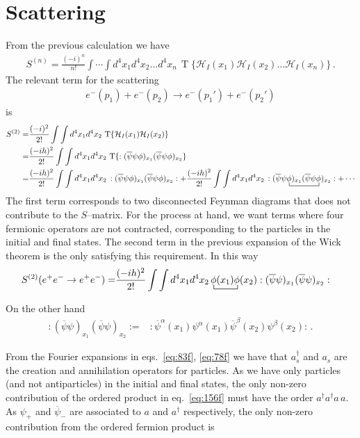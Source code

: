 \section{Scattering}
\label{sec:scattering}
From the previous calculation we have
\begin{align}
S^{(n)}=  \frac{(-i)^n}{n!}\int\cdots\int d^4x_1 d^4x_2\ldots d^4x_n\,\operatorname{T}\{\mathcal{H}_I(x_1)\mathcal{H}_I(x_2)\ldots\mathcal{H}_I(x_n)\}\,.
\end{align}
The relevant term for the scattering
\begin{align}
  e^{-}(p_1)+e^{-}(p_2)\to   e^{-}(p_1')+e^{-}(p_2')
\end{align}
is
\begin{align}
S^{(2)}=&  \frac{(-i)^2}{2!}\int\int d^4x_1 d^4x_2\,\operatorname{T}\{\mathcal{H}_I(x_1)\mathcal{H}_I(x_2)\}\nonumber\\
=&  \frac{(-ih)^2}{2!}\int\int d^4x_1 d^4x_2\,\operatorname{T}\{:(\overline{\psi}\psi\phi)_{x_1}(\overline{\psi}\psi\phi)_{x_2}\}\nonumber\\
=& 
 \frac{(-ih)^2}{2!}\int\int d^4x_1 d^4x_2\,:(\overline{\psi}\psi\phi)_{x_1}(\overline{\psi}\psi\phi
)_{x_2}:+
 \frac{(-ih)^2}{2!}\int\int d^4x_1 d^4x_2\,:(\overline{\psi}
\bcontraction{\psi}{\phi}{)_{x_1}(\overline{\psi}\psi}{\phi}
\psi\phi)_{x_1}(\overline{\psi}\psi\phi
)_{x_2}:+\cdots
\end{align}
The first term corresponds to two  disconnected Feynman diagrams that does not contribute to the $S$--matrix. For the process at hand, we want terms where four fermionic operators are not contracted, corresponding to the particles in the initial and final states. The second term in the previous expansion of the Wick theorem is the only satisfying this requirement. In this way
\begin{align}
  S^{(2)}(e^+ e^-\to e^+e^-)=&\frac{(-ih)^2}{2!}\int\int d^4x_1 d^4x_2
\bcontraction{\,}{\phi}{(x_1)}{\phi}
\,\phi(x_1)\phi(x_2):(\overline{\psi}\psi)_{x_1}(\overline{\psi}\psi)_{x_2}:
\end{align}

On the other hand 
\begin{align}
\label{eq:156f}
  :(\overline{\psi}\psi)_{x_1}(\overline{\psi}\psi)_{x_2}:=&
:\overline{\psi}^\alpha(x_1)\psi^\alpha(x_1)\overline{\psi}^\beta(x_2)\psi^\beta(x_2):\,.
\end{align}


From the Fourier expansions in eqs.~\eqref{eq:83f}, \eqref{eq:78f} we have that $a_s^\dagger$ and $a_s$ are the creation and annihilation operators for particles. As we have only particles (and not antiparticles) in the initial and final states, the only non-zero contribution of the ordered product in eq.~\eqref{eq:156f} must have the order $a^\dagger a^\dagger a\, a$. As $\psi_+$ and $\overline{\psi}_-$ are associated to $a$ and $a^\dagger$ respectively, the only non-zero contribution from the ordered fermion product is

